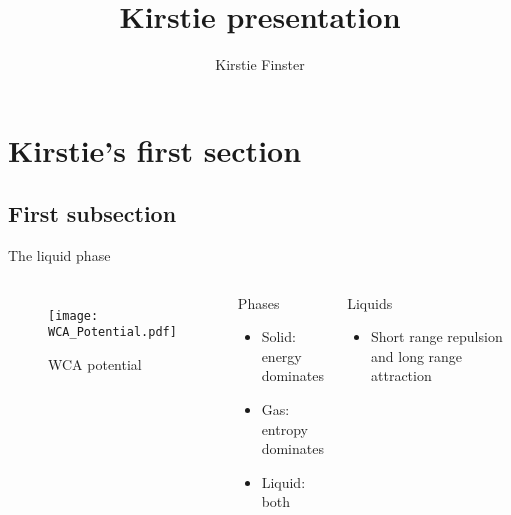 \documentclass{beamer}
\title[Short version of title]{Kirstie presentation}
\author{Kirstie Finster}
\begin{document}


\begin{frame}
	\titlepage
\end{frame}

\section*{Kirstie's first section}
\subsection*{First subsection}
\begin{frame}{The liquid phase}
	\begin{columns}[t]
        \begin{figure}
            \centering
            \texttt{[image: WCA\_Potential.pdf]}
            \caption{WCA potential}
            \label{fig:WCA_potential}
          \end{figure}
		\begin{block}{Phases}
			\begin{itemize}
				\item Solid: energy dominates
				\item Gas: entropy dominates
				\item Liquid: both
			\end{itemize}
		\end{block}
		\begin{block}{Liquids}
			\begin{itemize}
				\item Short range repulsion and long range attraction 
			\end{itemize}
		\end{block}
	\end{columns}
	
\end{frame}
\end{document}
